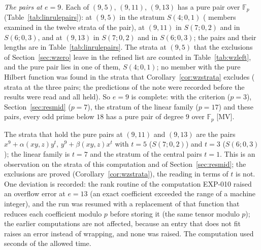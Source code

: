 \documentclass[11pt]{article}
\theoremstyle{definition}
\theoremstyle{remark}
\newcommand{\EXP}[1]{\mbox{EXP-#1}}
\newcommand{\F}{\mathbb{F}}
\begin{document}
\begin{table}[htbp]
\centering\footnotesize

\caption{The stratum $S(e-1;0,1)$ (the linear family) at the \nrulePairs{} pairs $(e,p)$ with $4\le e\le13$ and $e<p<2e$ that were computed: $2e-p$, the computation, the members examined and the pure members; pure members occur exactly when $2e-p\le3$.}
\label{tab:rule}
\end{table}

\emph{The pairs at $e=9$.} Each of $(9,5)$, $(9,11)$, $(9,13)$ has a pure pair over $\F_p$ (Table~\ref{tab:linrulepairs}): at $(9,5)$ in the stratum $S(4;0,1)$ (\nlinrNineFiveNineAll{} members examined in the twelve strata of the pair), at $(9,11)$ in $S(7;0,2)$ and in $S(6;0,3)$, and at $(9,13)$ in $S(7;0,2)$ and in $S(6;0,3)$; the pairs and their lengths are in Table~\ref{tab:linrulepairs}. The strata at $(9,5)$ that the exclusions of Section~\ref{sec:wzero} leave in the refined list are counted in Table~\ref{tab:wzleft}, and the pure pair lies in one of them, $S(4;0,1)$; no member with the pure Hilbert function was found in the strata that Corollary~\ref{cor:wzstrata} excludes (\nwzExcludedFifteen{} strata at the three pairs; the predictions of the note were recorded before the results were read and all held). So $e=9$ is complete: with the criterion ($p=3$), Section~\ref{sec:resmid} ($p=7$), the stratum of the linear family ($p=17$) and these pairs, every odd prime below $18$ has a pure pair of degree $9$ over $\F_p$ [MV].

\begin{table}[htbp]
\centering\footnotesize

\caption{Pure pairs found by \EXP{015}: the three pairs at $e=9$ (the strata $S(4;0,1)$ at $p=5$, $S(7;0,2)$ and $S(6;0,3)$ at $p=11$ and $13$) and one pair at each of the pairs $(10,17)$, $(10,19)$, $(11,19)$, $(12,23)$, $(13,23)$ in the stratum of the linear family: the stratum, the forms over $\F_p$ and the length of $U/(Uf+Ug)$; the script checks the stratum of each pair and recomputes the Hilbert function, the length and the rank of $\mu_{3e}$ for $e\le11$, and both instruments give the table $(1,2,2,1)$ on $(0,e,3e,4e)$.}
\label{tab:linrulepairs}
\end{table}

The strata that hold the pure pairs at $(9,11)$ and $(9,13)$ are the pairs $x^9+\alpha(xy,z)y^t$, $y^9+\beta(xy,z)x^t$ with $t=5$ ($S(7;0,2)$) and $t=3$ ($S(6;0,3)$); the linear family is $t=7$ and the stratum of the central pairs $t=1$. This is an observation on the strata of this computation and of Section~\ref{sec:resmid}; the exclusions are proved (Corollary~\ref{cor:wzstrata}), the reading in terms of $t$ is not. One deviation is recorded: the rank routine of the computation \EXP{010} raised an overflow error at $e=13$ (an exact coefficient exceeded the range of a machine integer), and the run was resumed with a replacement of that function that reduces each coefficient modulo $p$ before storing it (the same tensor modulo $p$); the earlier computations are not affected, because an entry that does not fit raises an error instead of wrapping, and none was raised. The computation used \nlinrSeconds{} seconds of the allowed time.
\end{document}
